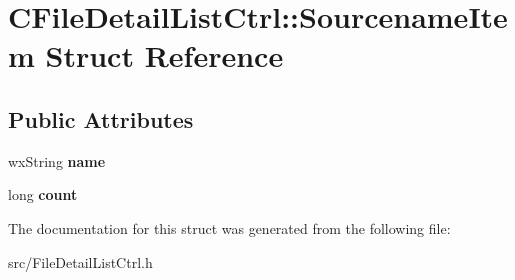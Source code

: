 \section{CFileDetailListCtrl::SourcenameItem Struct Reference}
\label{structCFileDetailListCtrl_1_1SourcenameItem}
\subsection*{Public Attributes}
\begin{DoxyCompactItemize}
\item 
wxString {\bfseries name}\label{structCFileDetailListCtrl_1_1SourcenameItem_a6af23ced2331b78df87ebb40cc82fc10}

\item 
long {\bfseries count}\label{structCFileDetailListCtrl_1_1SourcenameItem_ab7f1cd2289910905bb295e14ca0c772e}

\end{DoxyCompactItemize}


The documentation for this struct was generated from the following file:\begin{DoxyCompactItemize}
\item 
src/FileDetailListCtrl.h\end{DoxyCompactItemize}

